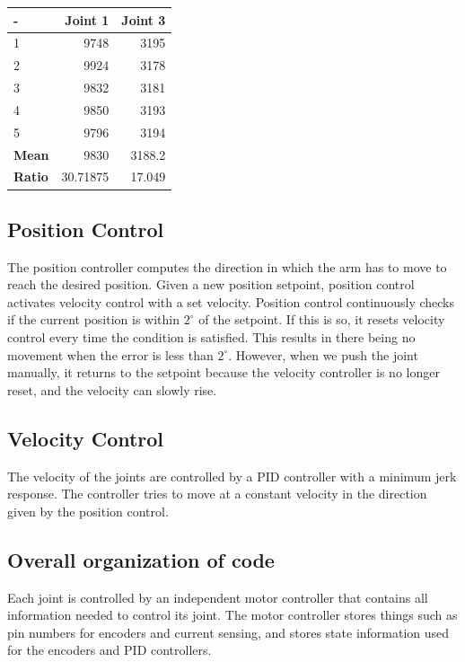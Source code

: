 \documentclass[10pt,a4paper]{article}
\begin{document}
\begin{tabular}{ | l | r | r |}
\hline
- & \textbf{Joint 1} & \textbf{Joint 3} \\
\hline
1 & 9748 & 3195 \\
\hline
2 & 9924 & 3178 \\
\hline
3 & 9832 & 3181 \\
\hline
4 & 9850 & 3193 \\
\hline
5 & 9796 & 3194 \\
\hline
\textbf{Mean} & 9830 & 3188.2 \\
\hline
\textbf{Ratio} & 30.71875 & 17.049 \\
\hline

\end{tabular}

\subsection{Position Control}
The position controller computes the direction in which the arm has to
move to reach the desired position. Given a new position setpoint,
position control activates velocity control with a set
velocity. Position control continuously checks if the current position
is within \( 2^{\circ}\) of the setpoint. If this is so, it resets
velocity control every time the condition is satisfied. This results
in there being no movement when the error is less than \(
2^{\circ}\). However, when we push the joint manually, it returns to
the setpoint because the velocity controller is no longer reset, and
the velocity can slowly rise.

\subsection{Velocity Control}
The velocity of the joints are controlled by a PID controller with a
minimum jerk response. The controller tries to move at a constant
velocity in the direction given by the position control.

\subsection{Overall organization of code}
Each joint is controlled by an independent motor controller that
contains all information needed to control its joint. The motor
controller stores things such as pin numbers for encoders and current
sensing, and stores state information used for the encoders and PID
controllers.
\end{document}
